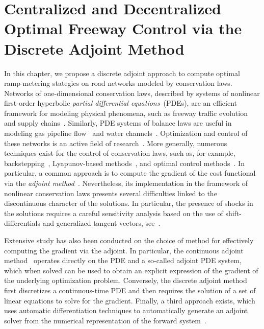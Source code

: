 \chapter{Centralized and Decentralized Optimal Freeway Control via the Discrete Adjoint Method}
\label{chapter:adjoint}

In  this chapter, we propose a discrete adjoint approach to compute optimal ramp-metering stategies on road networks modeled by conservation laws.
Networks of one-dimensional conservation laws,
described by systems of nonlinear first-order hyperbolic \textit{partial
differential equations}~(PDEs), are an efficient framework for modeling
physical phenomena, such as freeway traffic evolution~\cite{garavello2006traffic,work2010traffic,frazzoli2002real} and supply
chains~\cite{Brunnermeier1999}. Similarly, PDE systems of balance laws are useful in modeling gas pipeline flow~\cite{Gugat2011Gas,Rothfarb1970Optimal} and water channels~\cite{Gugat2012Contamination,Rabbani2010}. Optimization
and  control of these networks is an active field of
research~\cite{Gugat2005,Bayen2006,Kotsialos2004}. More generally, numerous
techniques exist for the control of conservation laws, such as, for example,
backstepping~\cite{Coron2013,Glass2007}, Lyapunov-based methods~\cite{Coron2013}, and
optimal control methods~\cite{Jacquet2006,Blanchard2013,Keller2013}.
In particular, a common  approach is to compute the gradient of the cost functional via the \textit{adjoint method}~\cite{Giles2000Introduction,Jameson2000Aerodynamic,Raffard2008}.
Nevertheless, its implementation in the framework of nonlinear conservation laws presents several difficulties linked to the discontinuous  character of the solutions. In particular, the presence of shocks in the solutions requires a careful sensitivity analysis based on the use of shift-differentials and generalized tangent vectors, see~\cite{Bressan1997ShiftDifferentiability,Ulbrich2002Sensitivity,Ulbrich2003AdjointBased}.

Extensive study has also been conducted on the choice of method for effectively computing the gradient via the adjoint. In particular, the continuous adjoint
method~\cite{Jacquet2005,Gugat2005,Moin1994,Reuther1996} operates directly on
the PDE and a so-called adjoint PDE system, which when solved can be used to
obtain an explicit  expression of the gradient of the underlying optimization
problem. Conversely,  the discrete adjoint
method~\cite{Giles2000,Gugat2005,Kotsialos2004} first discretizes a
continuous-time PDE and then requires the solution of a set of linear
equations  to solve for the gradient. Finally, a third approach exists, which
uses  automatic differentiation techniques to automatically generate an
adjoint  solver from the numerical representation of the forward
system~\cite{Muller2005,Giering1998}.

